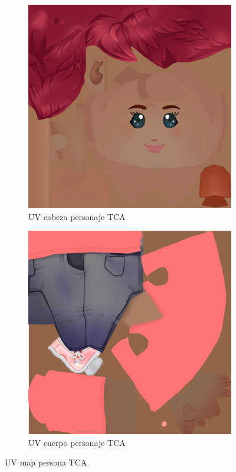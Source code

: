\documentclass[12pt, a4paper,twoside,titlepage]{book}
\begin{document}
 
 \begin{figure}
\centering
\begin{subfigure}{.5\textwidth}
  \centering
  \includegraphics[width=.95\linewidth]{TGF/Artes/TCA_head.png}
  \caption{UV cabeza personaje TCA}
\end{subfigure}%
\begin{subfigure}{.5\textwidth}
  \centering
  \includegraphics[width=.95\linewidth]{TGF/Artes/TCA_body.png}
  \caption{UV cuerpo personaje TCA}
\end{subfigure}
\caption{UV map persona TCA}
\label{fig:ArtesTCA1}
\end{figure}
\end{document}
